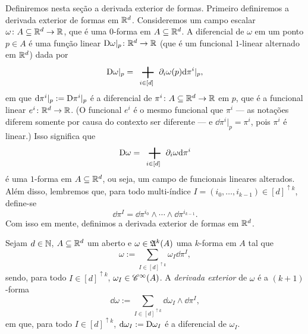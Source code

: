 Definiremos nesta seção a derivada exterior de formas. Primeiro definiremos a derivada exterior de formas em $\mathbb{R}^d$. Consideremos um campo escalar $\omega\colon A \subseteq \mathbb{R}^d \to \mathbb{R}$, que é uma $0$-forma em $A \subseteq \mathbb{R}^d$. A diferencial de $\omega$ em um ponto $p \in A$ é uma função linear $\mathrm{D} \omega|_p\colon \mathbb{R}^d \to \mathbb{R}$ (que é um funcional $1$-linear alternado em $\mathbb{R}^d$) dada por
	\begin{equation*}
	\D \omega|_p = \sum_{i \in [d]} \partial_i \omega(p) \dd\pi^i|_p,
	\end{equation*}
em que $\mathrm{d}\pi^i|_p := \mathrm{D}\pi^i|_p$ é a diferencial de $\pi^i\colon A \subseteq \mathbb{R}^d \to \mathbb{R}$ em $p$, que é a funcional linear $e^i\colon \mathbb{R}^d \to \mathbb{R}$. (O funcional $e^i$ é o mesmo funcional que $\pi^i$ --- as notações diferem somente por causa do contexto ser diferente --- e $\dd\pi^i|_p=\pi^i$, pois $\pi^i$ é linear.) Isso significa que
	\begin{equation*}
	\D\omega = \sum_{i \in [d]} \partial_i \omega \dd\pi^i
	\end{equation*}
é uma $1$-forma em $A \subseteq \mathbb{R}^d$, ou seja, um campo de funcionais lineares alterados. Além disso, lembremos que, para todo multi-índice $I=(i_0,\ldots,i_{k-1}) \in [d]^{\uparrow k}$, define-se
	\begin{equation*}
	\dd\pi^I = \dd\pi^{i_0} \wedge \cdots \wedge \dd\pi^{i_{k-1}}.
	\end{equation*}
Com isso em mente, definimos a derivada exterior de formas em $\mathbb{R}^d$.

\begin{definition}
Sejam $d \in \mathbb{N}$, $A \subseteq \mathbb{R}^d$ um aberto e $\omega \in \mathfrak{A}^k(A)$ uma $k$-forma em $A$ tal que
	\begin{equation*}
	\omega := \sum_{I \in [d]^{\uparrow k}} \omega_I \dd\pi^I,
	\end{equation*}
sendo, para todo $I \in [d]^{\uparrow k}$, $\omega_I \in \mathscr{C}^\infty(A)$. A \emph{derivada exterior} de $\omega$ é a $(k+1)$-forma
	\begin{equation*}
	\dd \omega := \sum_{I \in [d]^{\uparrow k}} \dd \omega_I \wedge \dd\pi^I,
	\end{equation*}
em que, para todo $I \in [d]^{\uparrow k}$, $\mathrm{d}\omega_I := \mathrm{D} \omega_I$ é a diferencial de $\omega_I$.
\end{definition}

